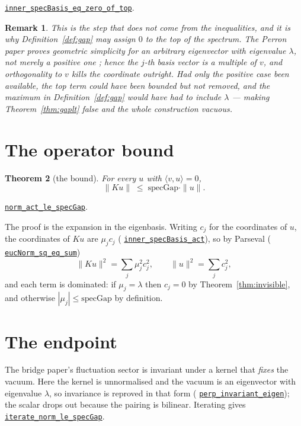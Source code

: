 \documentclass[11pt]{article}
\newtheorem{theorem}{Theorem}[section]
\newtheorem{remark}[theorem]{Remark}
\theoremstyle{definition}
\newcommand{\anchor}{9704b3f3c0d576bb40c43caa5360fbd64dfa1643}
\newcommand{\osline}[3]{%
  \href{https://github.com/lluiseriksson/THE-ERIKSSON-PROGRAMME/blob/\anchor/YangMills/OS/#1.lean\#L#2}{\nolinkurl{#3}}}
\begin{document}
\osline{SpatialSpectral}{227}{inner\_specBasis\_eq\_zero\_of\_top}.

\begin{remark}
This is the step that does not come from the inequalities, and it is why
Definition~\ref{def:gap} may assign $0$ to the top of the spectrum.  The Perron
paper proves geometric simplicity for an \emph{arbitrary} eigenvector with
eigenvalue $\lambda$, not merely a positive one \cite{ErikssonPerron}; hence the
$j$-th basis vector is a multiple of $v$, and orthogonality to $v$ kills the
coordinate outright.  Had only the positive case been available, the top term
could have been bounded but not removed, and the maximum in
Definition~\ref{def:gap} would have had to include $\lambda$ --- making
Theorem~\ref{thm:gaplt} false and the whole construction vacuous.
\end{remark}

\section{The operator bound}\label{sec:bound}

\begin{theorem}[the bound]\label{thm:bound}
For every $u$ with $\langle v,u\rangle = 0$,
\[
  \|Ku\| \;\le\; \mathrm{specGap}\cdot\|u\| .
\]
\end{theorem}

\osline{SpatialSpectral}{285}{norm\_act\_le\_specGap}.

The proof is the expansion in the eigenbasis.  Writing $c_j$ for the coordinates
of $u$, the coordinates of $Ku$ are $\mu_jc_j$
(\osline{SpatialSpectral}{245}{inner\_specBasis\_act}), so by Parseval
(\osline{SpatialSpectral}{267}{eucNorm\_sq\_eq\_sum})
\[
  \|Ku\|^2=\sum_j \mu_j^2c_j^2,\qquad \|u\|^2=\sum_j c_j^2 ,
\]
and each term is dominated: if $\mu_j=\lambda$ then $c_j=0$ by
Theorem~\ref{thm:invisible}, and otherwise $|\mu_j|\le\mathrm{specGap}$ by
definition.

\section{The endpoint}\label{sec:endpoint}

The bridge paper's fluctuation sector is invariant under a kernel that
\emph{fixes} the vacuum.  Here the kernel is unnormalised and the vacuum is an
eigenvector with eigenvalue $\lambda$, so invariance is reproved in that form
(\osline{SpatialSpectral}{378}{perp\_invariant\_eigen}); the scalar drops out
because the pairing is bilinear.  Iterating gives
\osline{SpatialSpectral}{393}{iterate\_norm\_le\_specGap}.
\end{document}
